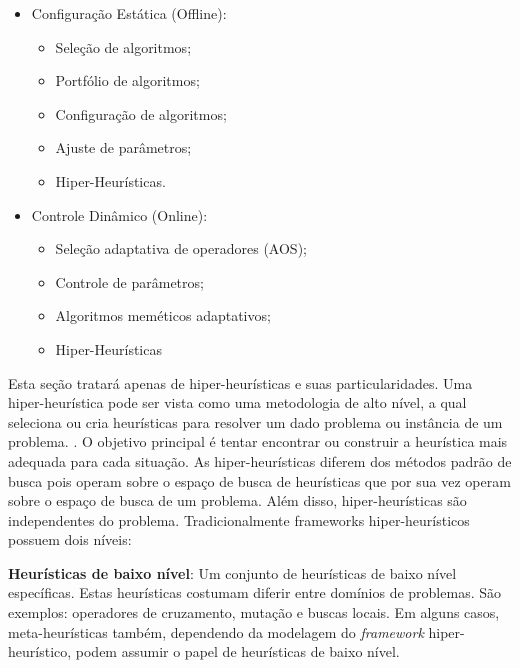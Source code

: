 \begin{itemize}
	\item Configuração Estática (Offline):
	\begin{itemize}
		\item Seleção de algoritmos;
		\item Portfólio de algoritmos;	
		\item Configuração de algoritmos;
		\item Ajuste de parâmetros;
		\item Hiper-Heurísticas.
	\end{itemize}
	\item Controle Dinâmico (Online):
	\begin{itemize}
		\item Seleção adaptativa de operadores (AOS);
		\item Controle de parâmetros;	
		\item Algoritmos meméticos adaptativos;
		\item Hiper-Heurísticas
	\end{itemize}
	
\end{itemize}


Esta seção tratará apenas de hiper-heurísticas e suas particularidades. Uma hiper-heurística pode ser vista como uma metodologia de alto nível, a qual seleciona ou cria heurísticas para resolver um dado problema ou instância de um problema. \cite{burke2013hyper}. O objetivo principal é tentar encontrar ou construir a heurística mais adequada para cada situação. As hiper-heurísticas diferem dos métodos padrão de busca pois operam sobre o espaço de busca de heurísticas que por sua vez operam sobre o espaço de busca de um problema. Além disso, hiper-heurísticas são independentes do problema. Tradicionalmente frameworks hiper-heurísticos possuem dois níveis: \cite{sabar2014automatic}

\textbf{Heurísticas de baixo nível}:  Um conjunto de heurísticas de baixo nível específicas. Estas heurísticas costumam diferir entre domínios de problemas. São exemplos: operadores de cruzamento, mutação e buscas locais. Em alguns casos, meta-heurísticas também, dependendo da modelagem do \textit{framework} hiper-heurístico, podem assumir o papel de heurísticas de baixo nível. 

